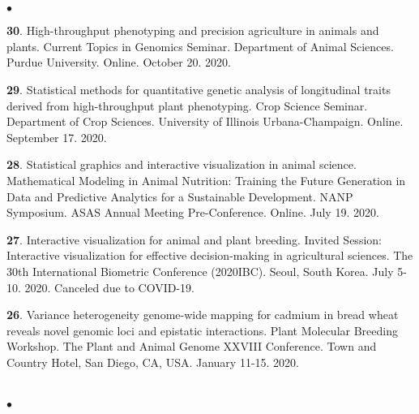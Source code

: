 \documentclass[margin,line,10pt]{res}
\newenvironment{list2}{
  \begin{list}{$\bullet$}{%
      \setlength{\itemsep}{0in}
      \setlength{\parsep}{0in} \setlength{\parskip}{0in}
      \setlength{\topsep}{0in} \setlength{\partopsep}{0in} 
      \setlength{\leftmargin}{0.2in}}}{\end{list}}
\begin{document}
\begin{resume}
\section{}
\begin{list2}

  \item [{\bf 30}.] High-throughput phenotyping and precision agriculture in animals and plants. Current Topics in Genomics Seminar. Department of Animal Sciences. Purdue University. Online. October 20. 2020.

     \vspace{0.5cm}

 \item [{\bf 29}.] Statistical methods for quantitative genetic analysis of longitudinal traits derived from high-throughput plant phenotyping. Crop Science Seminar. Department of Crop Sciences. University of Illinois Urbana-Champaign. Online. September 17. 2020.

     \vspace{0.5cm}

 \item [{\bf 28}.] Statistical graphics and interactive visualization in animal science. Mathematical Modeling in Animal Nutrition: Training the Future Generation in Data and Predictive Analytics for a Sustainable Development. NANP Symposium. ASAS Annual Meeting Pre-Conference. Online. July 19. 2020.


  \vspace{0.5cm}


\item [{\bf 27}.] Interactive visualization for animal and plant breeding. Invited Session: Interactive visualization for effective decision-making in agricultural sciences. The 30th International Biometric Conference (2020IBC). Seoul, South Korea. July 5-10. 2020. Canceled due to COVID-19. 

  \vspace{0.5cm}
    
\item [{\bf 26}.] Variance heterogeneity genome-wide mapping for cadmium in bread wheat reveals novel genomic loci and epistatic interactions. Plant Molecular Breeding Workshop. The Plant and Animal Genome XXVIII Conference. Town and Country Hotel, San Diego, CA, USA. January 11-15. 2020.
  
\end{list2}



\section{}
\begin{list2}


\end{list2}
\end{resume}
\end{document}
